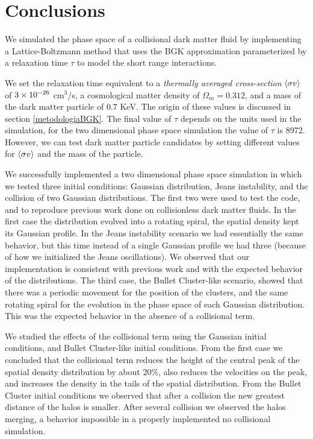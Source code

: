 \chapter{Conclusions}
We simulated the phase space of a collisional dark matter fluid by implementing a Lattice-Boltzmann method that uses the BGK approximation parameterized by a relaxation time $\tau$ to model the short range interactions. 

We set the relaxation time equivalent to a \emph{thermally averaged cross-section}  $\langle \sigma v \rangle$ of $ 3 \times 10^{-26}$ cm$^3$/s, a cosmological matter density of $\Omega_m = 0.312$, and a mass of the dark matter particle of $0.7$ KeV. The origin of these values is discussed in section \ref{metodologiaBGK}. The final value of $\tau$ depends on the units used in the simulation, for the two dimensional phase space simulation the value of $\tau$ is 8972. However, we can test dark matter particle candidates by setting different values for $\langle \sigma v \rangle$ and the mass of the particle. 

We successfully implemented a two dimensional phase space simulation in which we tested three initial conditions: Gaussian distribution, Jeans instability, and the collision of two Gaussian distributions. 
The first two were used to test the code, and to reproduce previous work done on collisionless dark matter fluids. 
In the first case the distribution evolved into a rotating spiral, the spatial density kept its Gaussian profile.
In the Jeans instability scenario we had essentially the same behavior, but this time instead of a single Gaussian profile we had three (because of how we initialized the Jeans oscillations).
We observed that our implementation is consistent with previous work and with the expected behavior of the distributions. The third case, the Bullet Cluster-like scenario, showed that there was a periodic movement for the position of the clusters, and the same rotating spiral for the evolution in the phase space of each Gaussian distribution. This was the expected behavior in the absence of a collisional term.

We studied the effects of the collisional term using the Gaussian initial conditions, and Bullet Cluster-like initial conditions. From the first case we concluded that the collisional term reduces the height of the central peak of the spatial density distribution by about 20$\%$, also reduces the velocities on the peak, and increases the density in the tails of the spatial distribution.
From the Bullet Cluster initial conditions we observed that after a collision the new greatest distance of the halos is smaller. After several collision we observed the halos merging, a behavior impossible in a properly implemented no collisional simulation.

